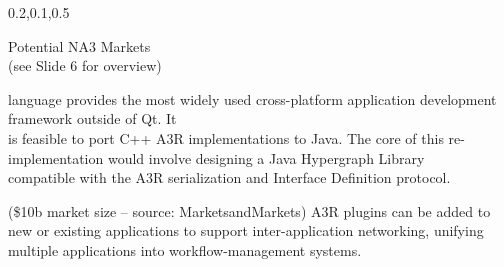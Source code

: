 \begin{frame}{}
{\begin{center}
\begin{minipage}{\textwidth}
{\begin{minipage}{\textwidth}
\begin{lightquadblockc}{0.2,0.1,0.5}{\parbox{21cm}{\vspace*{10pt}\centering Potential NA3 Markets \\(see Slide 6 for overview)\vspace*{10pt}}}
\begin{minipage}{1.1\textwidth}
{\begin{description}
language provides the most widely used cross-platform 
application development framework outside of Qt.  
It \\is feasible to port C++ A3R implementations 
to Java.  The core of this re-implementation would 
involve designing a Java Hypergraph Library \\compatible 
with the A3R serialization and Interface Definition 
protocol.\vspace{10pt}
\item[Workflow Management] 
({\texttildelow}\$10b market size -- 
source: 
{\selectfont MarketsandMarkets}) 
A3R plugins can be added to new or existing 
applications to support inter-application 
networking, unifying multiple applications into workflow-management systems.
\vspace{.75em}  
\end{description}}\end{minipage}
\end{lightquadblockc}
\end{minipage}}


\end{minipage}
\end{center}
}

\end{frame}
